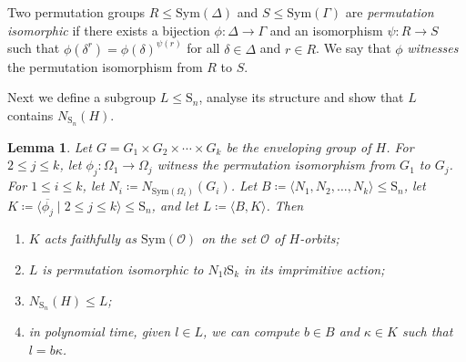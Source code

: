 \documentclass[11pt,a4paper]{article}
\newtheorem{lemma}[theorem]{Lemma}
\theoremstyle{definition}
\theoremstyle{remark}
\newcommand{\Sym}[0]{\mathrm{Sym}}
\newcommand{\Sy}{\mathrm{S}}
\begin{document}
Two permutation groups $R \leq \Sym(\Delta)$ and $S\leq \Sym(\Gamma)$ are \emph{permutation isomorphic} if there exists a bijection $\phi : \Delta \rightarrow \Gamma$ and an isomorphism $\psi: R \rightarrow S$ such that $\phi(\delta^r) = \phi(\delta)^{\psi(r)}$ for all $\delta \in \Delta$ and $r \in R$.
We say that $\phi$ \emph{witnesses} the permutation isomorphism from $R$ to $S$. 

Next we define a subgroup $L \leq \Sy_n$, analyse its structure and show that $L$ contains $N_{\Sy_n}(H)$. 

\begin{lemma} \label{define and analyse L}\label{def of subdirect of perm isom copies}{\label{normInWreath}}
Let $G = G_1 \times G_2 \times \cdots \times G_k$ be the enveloping group of $H$. 
For $2 \leq j \leq k$, let $\phi_{j}: \Omega_1 \rightarrow \Omega_j$ witness the permutation isomorphism from $G_1$ to $G_j$. 
For $1 \leq i \leq k$, let $N_i  \coloneqq  N_{\Sym(\Omega_i)}(G_i)$.
Let $B  \coloneqq  \langle N_1, N_2 , \ldots , N_k \rangle \leq \Sy_n$, let $K \coloneqq \langle \overline{\phi_j} \mid 2 \leq j \leq k  \rangle \leq \Sy_n$, and let $L \coloneqq  \langle  B,  K \rangle$. Then
\begin{enumerate}
    \item \label{K isom Sk} 
    $K$ acts faithfully as $\Sym(\mathcal{O})$ on the set $\mathcal{O}$ of $H$-orbits; 
    \item \label{item: L is wreath} $L$ is permutation isomorphic to $N_1 \wr \Sy_k$ in its imprimitive action;
    \item \label{norm of H in wreath} $N_{\Sy_n}(H) \leq L$;
    \item \label{norm to BK} in polynomial time, given $l \in L$,  we can compute $b \in B$ and $\kappa \in K$ such that $l = b\kappa$.
\end{enumerate}
\end{lemma}
\end{document}
